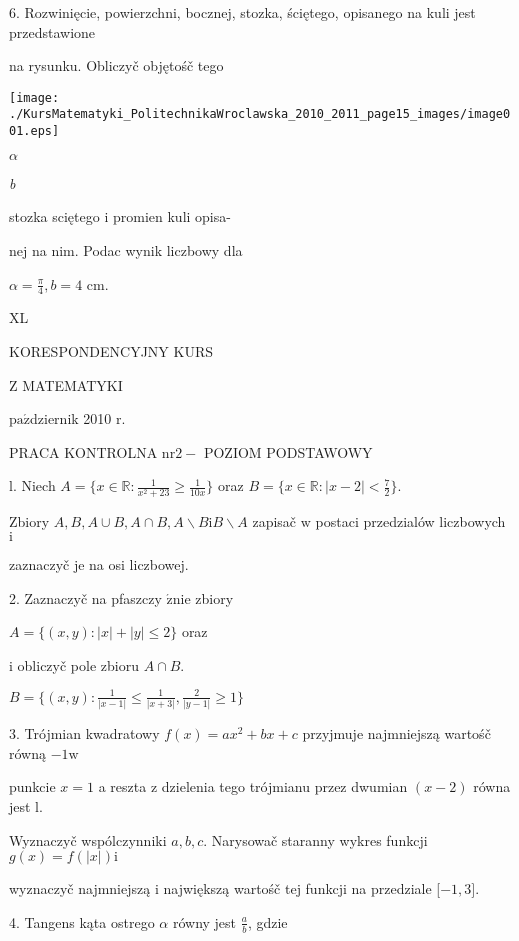 \documentclass[a4paper,12pt]{article}
\begin{document}
6. Rozwinięcie, powierzchni, bocznej, stozka, ściętego, opisanego na kuli jest przedstawione

na rysunku. Obliczyč objętośč tego
\begin{center}
\texttt{[image: ./KursMatematyki\_PolitechnikaWroclawska\_2010\_2011\_page15\_images/image001.eps]}
\end{center}
$\alpha$

{\it b}

stozka sciętego $\mathrm{i}$ promien kuli opisa-

nej na nim. Podac wynik liczbowy dla

$\displaystyle \alpha=\frac{\pi}{4}, b=4$ cm.





XL

KORESPONDENCYJNY KURS

Z MATEMATYKI

$\mathrm{p}\mathrm{a}\acute{\mathrm{z}}$dziernik 2010 $\mathrm{r}.$

PRACA KONTROLNA $\mathrm{n}\mathrm{r} 2-$ POZIOM PODSTAWOWY

l. Niech $A=\displaystyle \{x\in \mathbb{R}:\frac{1}{x^{2}+23}\geq\frac{1}{10x}\}$ oraz $B=\displaystyle \{x\in \mathbb{R}:|x-2|<\frac{7}{2}\}.$

Zbiory $A, B, A\cup B, A\cap B, A\backslash B\mathrm{i}B\backslash A$ zapisač $\mathrm{w}$ postaci przedzialów liczbowych $\mathrm{i}$

zaznaczyč je na osi liczbowej.

2. Zaznaczyč na pfaszczy $\acute{\mathrm{z}}\mathrm{n}\mathrm{i}\mathrm{e}$ zbiory

$A=\{(x,y):|x|+|y|\leq 2\}$ oraz

$\mathrm{i}$ obliczyč pole zbioru $A\cap B.$

$B=\displaystyle \{(x,y):\frac{1}{|x-1|}\leq\frac{1}{|x+3|},\frac{2}{|y-1|}\geq 1\}$

3. Trójmian kwadratowy $f(x)=ax^{2}+bx+c$ przyjmuje najmniejszą wartośč równą $-1 \mathrm{w}$

punkcie $x=1$ a reszta $\mathrm{z}$ dzielenia tego trójmianu przez dwumian $(x-2)$ równa jest l.

Wyznaczyč wspólczynniki $a, b, c$. Narysowač staranny wykres funkcji $g(x) = f(|x|) \mathrm{i}$

wyznaczyč najmniejszą $\mathrm{i}$ największą wartośč tej funkcji na przedziale [$-1,3].$

4. Tangens kąta ostrego $\alpha$ równy jest $\displaystyle \frac{a}{b}$, gdzie
\end{document}
